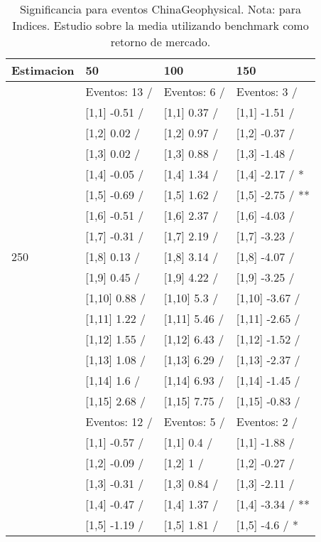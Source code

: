 \begin{table}

\caption{Significancia para eventos ChinaGeophysical. Nota: para Indices. Estudio sobre la media utilizando benchmark como retorno de mercado.}
\centering
\begin{tabular}[t]{llll}
\toprule
Estimacion & 50 & 100 & 150\\
\midrule
 & Eventos:  13 / & Eventos:  6 / & Eventos:  3 /\\
 & {}[1,1] -0.51  / & {}[1,1] 0.37  / & {}[1,1] -1.51  /\\
 & {}[1,2] 0.02  / & {}[1,2] 0.97  / & {}[1,2] -0.37  /\\
 & {}[1,3] 0.02  / & {}[1,3] 0.88  / & {}[1,3] -1.48  /\\
 & {}[1,4] -0.05  / & {}[1,4] 1.34  / & {}[1,4] -2.17  / *\\
\addlinespace
 & {}[1,5] -0.69  / & {}[1,5] 1.62  / & {}[1,5] -2.75  / **\\
 & {}[1,6] -0.51  / & {}[1,6] 2.37  / & {}[1,6] -4.03  /\\
 & {}[1,7] -0.31  / & {}[1,7] 2.19  / & {}[1,7] -3.23  /\\
250 & {}[1,8] 0.13  / & {}[1,8] 3.14  / & {}[1,8] -4.07  /\\
 & {}[1,9] 0.45  / & {}[1,9] 4.22  / & {}[1,9] -3.25  /\\
\addlinespace
 & {}[1,10] 0.88  / & {}[1,10] 5.3  / & {}[1,10] -3.67  /\\
 & {}[1,11] 1.22  / & {}[1,11] 5.46  / & {}[1,11] -2.65  /\\
 & {}[1,12] 1.55  / & {}[1,12] 6.43  / & {}[1,12] -1.52  /\\
 & {}[1,13] 1.08  / & {}[1,13] 6.29  / & {}[1,13] -2.37  /\\
 & {}[1,14] 1.6  / & {}[1,14] 6.93  / & {}[1,14] -1.45  /\\
\addlinespace
 & {}[1,15] 2.68  / & {}[1,15] 7.75  / & {}[1,15] -0.83  /\\
 & Eventos:  12 / & Eventos:  5 / & Eventos:  2 /\\
 & {}[1,1] -0.57  / & {}[1,1] 0.4  / & {}[1,1] -1.88  /\\
 & {}[1,2] -0.09  / & {}[1,2] 1  / & {}[1,2] -0.27  /\\
 & {}[1,3] -0.31  / & {}[1,3] 0.84  / & {}[1,3] -2.11  /\\
\addlinespace
 & {}[1,4] -0.47  / & {}[1,4] 1.37  / & {}[1,4] -3.34  / **\\
 & {}[1,5] -1.19  / & {}[1,5] 1.81  / & {}[1,5] -4.6  / *\\

\end{tabular}
\end{table}
